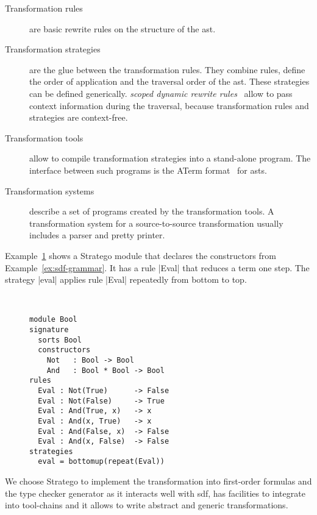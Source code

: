 \begin{description}
\item[Transformation rules] are basic rewrite rules on the structure
  of the \gls{ast}.
\item[Transformation strategies] are the glue between the
  transformation rules. They combine rules, define the order of
  application and the traversal order of the \gls{ast}. These
  strategies can be defined generically. \textit{scoped dynamic
    rewrite rules}~\cite{Visser01scopeddynamic} allow to pass context
  information during the traversal, because transformation rules and
  strategies are context-free.
\item[Transformation tools] allow to compile transformation strategies
  into a stand-alone program. The interface between such programs is
  the ATerm format~\cite{VandenBrand:2000:EAT:343460.343468} for
  \glspl{ast}.
\item[Transformation systems] describe a set of programs created by
  the transformation tools. A transformation system for a
  source-to-source transformation usually includes a parser and pretty
  printer.
\end{description}

Example~\ref{ex:stratego-module} shows a Stratego module that declares
the constructors from Example~\ref{ex:sdf-grammar}. It has a rule
\code|Eval| that reduces a term one step. The strategy \code|eval|
applies rule \code|Eval| repeatedly from bottom to top.

\begin{figure}
\begin{example}{~}
\begin{lstlisting}[language=stratego]
module Bool
signature
  sorts Bool
  constructors
    Not   : Bool -> Bool 
    And   : Bool * Bool -> Bool
rules
  Eval : Not(True)      -> False
  Eval : Not(False)     -> True
  Eval : And(True, x)   -> x
  Eval : And(x, True)   -> x
  Eval : And(False, x)  -> False
  Eval : And(x, False)  -> False
strategies
  eval = bottomup(repeat(Eval))
\end{lstlisting}
\label{ex:stratego-module}
\end{example}
\end{figure}

We choose Stratego to implement the transformation into first-order
formulas and the type checker generator as it interacts well with
\gls{sdf}, has facilities to integrate into tool-chains and it allows
to write abstract and generic transformations.

